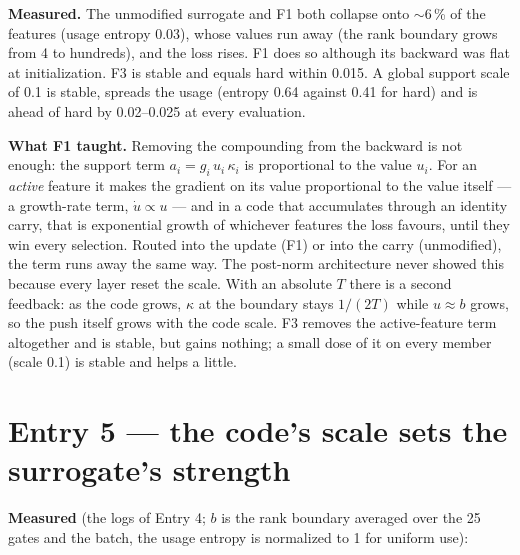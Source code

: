 \documentclass[11pt,a4paper]{article}
\begin{document}
\textbf{Measured.}  The unmodified surrogate and F1 both collapse onto \(\sim\)6\,\% of the features (usage entropy
0.03), whose values run away (the rank boundary grows from 4 to hundreds), and the loss rises.  F1 does so although
its backward was flat at initialization.  F3 is stable and equals hard within 0.015.  A global support scale of 0.1
is stable, spreads the usage (entropy 0.64 against 0.41 for hard) and is ahead of hard by 0.02--0.025 at every
evaluation.

\textbf{What F1 taught.}  Removing the compounding from the backward is not enough: the support term
\(a_i=g_i\,u_i\,\kappa_i\) is proportional to the value \(u_i\).  For an \emph{active} feature it makes the gradient on
its value proportional to the value itself --- a growth-rate term, \(\dot u\propto u\) --- and in a code that
accumulates through an identity carry, that is exponential growth of whichever features the loss favours, until
they win every selection.  Routed into the update (F1) or into the carry (unmodified), the term runs away the same
way.  The post-norm architecture never showed this because every layer reset the scale.  With an absolute \(T\)
there is a second feedback: as the code grows, \(\kappa\) at the boundary stays \(1/(2T)\) while \(u\approx b\) grows, so
the push itself grows with the code scale.  F3 removes the active-feature term altogether and is stable, but gains
nothing; a small dose of it on every member (scale 0.1) is stable and helps a little.

\section{Entry 5 --- the code's scale sets the surrogate's strength}

\textbf{Measured} (the logs of Entry 4; \(b\) is the rank boundary averaged over the 25 gates and the batch, the
usage entropy is normalized to 1 for uniform use):
\end{document}
